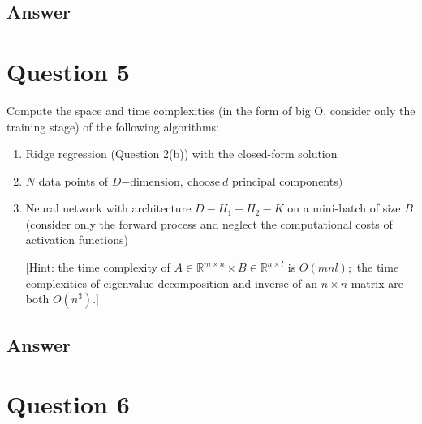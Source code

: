 \documentclass[
	12pt, %
]{fphw}
\begin{document}
\subsection*{Answer}

\section*{Question 5}

\begin{problem}
	Compute the space and time complexities (in the form of big O, consider only the training
stage) of the following algorithms:
\begin{enumerate}
\item Ridge regression (Question 2(b)) with the closed-form solution 
\item $N$ data points of $D\mathrm{- dimension, ~choose~}d$ principal components$) $
\item Neural network with architecture $D-H_1-H_2-K$ on a mini-batch of size $B$ (consider only
the forward process and neglect the computational costs of activation functions) 

[Hint: the time complexity of $A\in\mathbb{R}^{m\times n}\times B\in\mathbb{R}^{n\times l}$ is $O(mnl);$ the time complexities of
 eigenvalue decomposition and inverse of an $n\times n$ matrix are both $O(n^3).]$
\end{enumerate}
\end{problem}
\subsection*{Answer}


\section*{Question 6}
\end{document}
